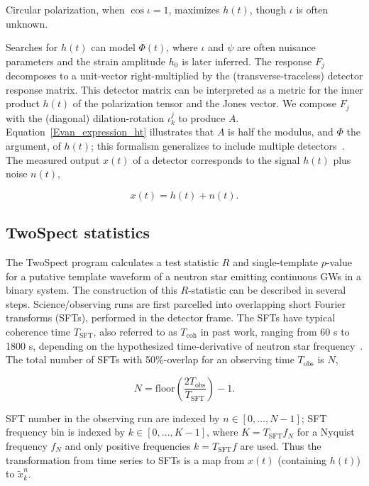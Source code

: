 \noindent Circular polarization, when $\cos \iota =1$, maximizes $h(t)$, though $\iota$ is often unknown.

Searches for $h(t)$ can model $\Phi(t)$, where $\iota$ and $\psi$ are often nuisance parameters and the strain amplitude $h_0$ is later inferred.
The response $F_j$ decomposes to a unit-vector right-multiplied by the (transverse-traceless) detector response matrix. 
This detector matrix can be interpreted as a metric for the inner product $h(t)$ of the polarization tensor and the Jones vector.
We compose $F_j$ with the (diagonal) dilation-rotation $\iota^j_k$ to produce $A$.
Equation~\ref{Evan_expression_ht} illustrates that $A$ is half the modulus, and $\Phi$ the argument, of $h(t)$; this formalism generalizes to include multiple detectors~\cite{TwoSpectCoherentGoetz2015}. 
The measured output $x(t)$ of a detector corresponds to the signal $h(t)$ plus noise $n(t)$,

\begin{equation}
x(t) = h(t) + n(t).
\end{equation}

        \subsection{TwoSpect statistics}
        \label{all-sky}

The TwoSpect program calculates a test statistic $R$ and single-template $p$-value for a putative template waveform of a neutron star emitting continuous GWs in a binary system.
The construction of this $R$-statistic can be described in several steps.
Science/observing runs are first parcelled into overlapping short Fourier transforms (SFTs), performed in the detector frame.
The SFTs have typical coherence time $T_\mathrm{SFT}$, also referred to as $T_\mathrm{coh}$ in past work, ranging from 60 s to 1800 s, depending on the hypothesized time-derivative of neutron star frequency~\cite{GoetzTwoSpectMethods2011}.
The total number of SFTs with 50\%-overlap for an observing time $T_\mathrm{obs}$ is $N$,

\begin{equation}
N = \mathrm{floor}\left(\frac{2 T_\mathrm{obs}}{T_\mathrm{SFT}}\right) - 1.
\end{equation}

\noindent SFT number in the observing run are indexed by $n \in [0,\ldots,N-1]$; SFT frequency bin is indexed by $k \in [0,\ldots,K -1]$, where $K = T_\mathrm{SFT} f_N$ for a Nyquist frequency $f_N$ and only positive frequencies $k = T_\mathrm{SFT} f$ are used. 
Thus the transformation from time series to SFTs is a map from $x(t)$ (containing $h(t)$) to $\tilde{x}^n_k$.

